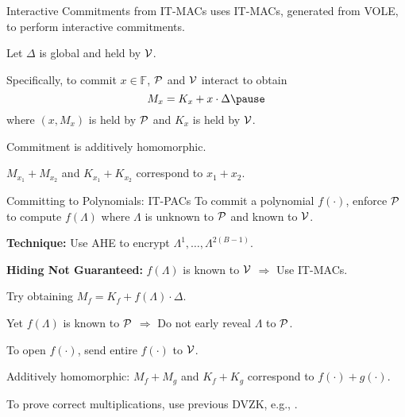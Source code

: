 \begin{frame}{Interactive Commitments from IT-MACs}
	\cite{BaumMRS21, YangSWW21, DittmerIO21} uses IT-MACs, generated from VOLE, to perform interactive commitments. \pause
	
	Let  $\Delta$ is global and held by $\mathcal{V}$.\pause
	
	Specifically, to commit $x \in \mathbb{F}$,  $\mathcal{P}$ and $\mathcal{V}$ interact to obtain\pause
	\begin{equation*}
		M_x = K_x + x\cdot \Delta\pause
	\end{equation*}
	where $(x, M_x)$ is held by $\mathcal{P}$ and $K_x$ is held by $\mathcal{V}$.\pause
	
	Commitment is additively homomorphic. \pause
	
	$M_{x_1} + M_{x_2}$ and $K_{x_1} + K_{x_2}$ correspond to $x_1 + x_2$.
\end{frame}
\begin{frame}{Committing to Polynomials: IT-PACs}
	To commit a polynomial $f(\cdot)$, enforce $\mathcal{P}$ to compute $f(\Lambda)$ where $\Lambda$ is unknown to $\mathcal{P}$ and known to $\mathcal{V}$.\pause
	
	\textbf{Technique:} Use AHE to encrypt $\Lambda^1, \dots, \Lambda^{2(B - 1)}$.\pause
	
	\textbf{Hiding Not Guaranteed:} $f(\Lambda)$ is known to $\mathcal{V}$ $\Rightarrow$ Use IT-MACs.\pause
	
	Try obtaining $M_f = K_f + f(\Lambda) \cdot \Delta$.\pause
	
	Yet $f(\Lambda)$ is known to $\mathcal{P}$ $\Rightarrow$ Do not early reveal $\Lambda$ to $\mathcal{P}$.\pause
	
	To open $f(\cdot)$, send entire $f(\cdot)$ to $\mathcal{V}$.\pause
	
	Additively homomorphic: $M_{f} + M_{g}$ and $K_{f} + K_{g}$ correspond to $f(\cdot) + g(\cdot)$.\pause
	
	To prove correct multiplications, use previous DVZK, e.g., \cite{YangSWW21}.
\end{frame}
